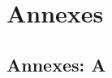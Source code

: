 \documentclass[a4paper,11pt]{article}
\begin{document}
\section{Annexes}
    
    \subsection{Annexes: A}
    \label{annexes_a}

%
%
%
%
%
\end{document}

